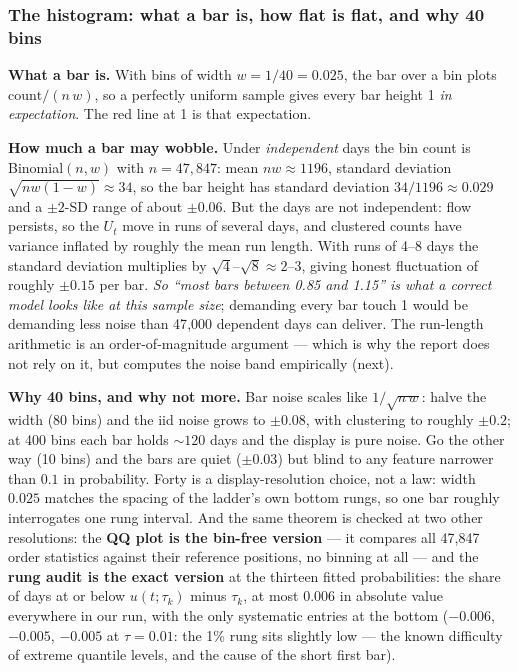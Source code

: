 \documentclass[11pt]{article}
\begin{document}
\subsubsection{The histogram: what a bar is, how flat is flat, and why 40 bins}
\label{sec:pitbars}

\textbf{What a bar is.} With bins of width $w = 1/40 = 0.025$, the bar over a
bin plots $\text{count}/(n\,w)$, so a perfectly uniform sample gives every
bar height 1 \emph{in expectation}. The red line at 1 is that expectation.

\textbf{How much a bar may wobble.} Under \emph{independent} days the bin
count is Binomial$(n, w)$ with $n = 47{,}847$: mean $nw \approx 1196$,
standard deviation $\sqrt{nw(1-w)} \approx 34$, so the bar height has
standard deviation $34/1196 \approx 0.029$ and a $\pm 2$-SD range of about
$\pm 0.06$. But the days are not independent: flow persists, so the $U_t$
move in runs of several days, and clustered counts have variance inflated by
roughly the mean run length. With runs of 4--8 days the standard deviation
multiplies by $\sqrt{4}$--$\sqrt{8} \approx 2$--$3$, giving honest
fluctuation of roughly $\pm 0.15$ per bar. \emph{So ``most bars between 0.85
and 1.15'' is what a correct model looks like at this sample size}; demanding
every bar touch 1 would be demanding less noise than 47{,}000 dependent days
can deliver. The run-length arithmetic is an order-of-magnitude argument ---
which is why the report does not rely on it, but computes the noise band
empirically (next).

\textbf{Why 40 bins, and why not more.} Bar noise scales like
$1/\sqrt{n\,w}$: halve the width (80 bins) and the iid noise grows to
$\pm 0.08$, with clustering to roughly $\pm 0.2$; at 400 bins each bar holds
$\sim 120$ days and the display is pure noise. Go the other way (10 bins) and
the bars are quiet ($\pm 0.03$) but blind to any feature narrower than $0.1$
in probability. Forty is a display-resolution choice, not a law: width
$0.025$ matches the spacing of the ladder's own bottom rungs, so one bar
roughly interrogates one rung interval. And the same theorem is checked at
two other resolutions: the \textbf{QQ plot is the bin-free version} --- it
compares all 47{,}847 order statistics against their reference positions, no
binning at all --- and the \textbf{rung audit is the exact version} at the
thirteen fitted probabilities: the share of days at or below $u(t;\tau_k)$
minus $\tau_k$, at most $0.006$ in absolute value everywhere in our run, with
the only systematic entries at the bottom ($-0.006$, $-0.005$, $-0.005$ at
$\tau = 0.01$: the 1\% rung sits slightly low --- the known difficulty of
extreme quantile levels, and the cause of the short first bar).
\end{document}
